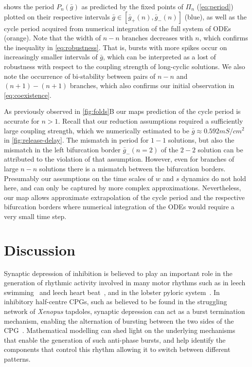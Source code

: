\documentclass[utf8]{frontiersFPHY} %
\newcommand{\gbar}{\bar g}
\begin{document}
 shows the period $P_n(\gbar)$ as predicted by the fixed points of $\Pi_n$ (\cref{eq:period}) plotted on their respective intervals $\gbar \in [\gbar_+(n),\gbar_-(n)]$ (blue), as well as the cycle period acquired from numerical integration of the full system of ODEs (orange).
Note that the width of $n-n$ branches decreases with $n$, which confirms the inequality in \cref{eq:robustness}.
That is, bursts with more spikes occur on increasingly smaller intervals of $\gbar$, which can be interpreted as a lost of robustness with respect to the coupling strength of long-cyclic solutions.
We also note the occurrence of bi-stability between pairs of $n-n$ and $(n+1)-(n+1)$ branches, which also confirms our initial observation in \cref{eq:coexistence}.

As previously observed in \cref{fig:folds}B our maps prediction of the cycle period is accurate for $n>1$.
Recall that our reduction assumptions required a sufficiently large coupling strength, which we numerically estimated to be $\gbar \approx 0.592\si{mS/cm^2}$ in \cref{fig:release-delay}.
The mismatch in period for $1-1$ solutions, but also the mismatch in the left bifurcation border $\gbar_-(n=2)$ of the $2-2$ solution can be attributed to the violation of that assumption.
However, even for branches of large $n-n$ solutions there is a mismatch between the bifurcation borders.
Presumably our assumptions on the time scales of $w$ and $s$ dynamics do not hold here, and can only be captured by more complex approximations.
Nevertheless, our map allows approximate extrapolation of the cycle period and the respective bifurcation borders where numerical integration of the ODEs would require a very small time step.

\section{Discussion}
Synaptic depression of inhibition is believed to play an important role in the generation of rhythmic activity involved in many motor rhythms such as in leech swimming~\citep{mangan1994} and leech heart beat~\citep{calabrese1995}, and in the lobster pyloric system~\citep{manor1997, rabbah2007}.
In inhibitory half-centre CPGs, such as believed to be found in the struggling network of \textit{Xenopus} tapdoles,  synaptic depression can act as a burst termination mechanism, enabling the alternation of bursting between the two sides of the CPG~\citep{li2007}.
Mathematical modelling can shed light on the underlying mechanisms that enable the generation of such anti-phase bursts, and help identify the components that control this rhythm allowing it to switch between different patterns.
\end{document}
